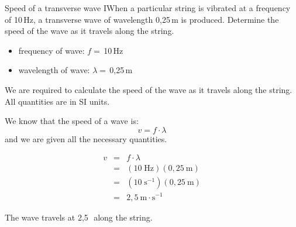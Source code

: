 \begin{wex}{Speed of a transverse wave I}{When a particular string is vibrated at a frequency of 10\,Hz, a transverse wave of wavelength 0,25\,m is produced. Determine the speed of the wave as it travels along the string.}
{
\begin{itemize}
\item{frequency of wave: $f=$\,10\,Hz}
\item{wavelength of wave: $\lambda=$\,0,25\,m}
\end{itemize}
We are required to calculate the speed of the wave as it travels along the string. All quantities are in SI units.

We know that the speed of a wave is:
\begin{equation*}
v=f\cdot \lambda 
\end{equation*}
and we are given all the necessary quantities.

\begin{eqnarray*}
v&=&f\cdot \lambda\\
&=&(10\;\text{Hz})(0,25~\text{m})\\
&=&(10\;\text{s}^{-1})(0,25~\text{m})\\
&=&2,5~\text{m} \cdot \text{s}^{-1}
\end{eqnarray*}

The wave travels at 2,5\,\ms\ along the string.
}
\end{wex}


